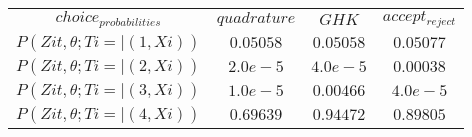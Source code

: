 \begin{tabular}{cccc}
$choice_{probabilities}$ & $quadrature$ & $GHK$ & $accept_{reject}$\\
$P\left( Zit, \theta; Ti = |\left( 1, Xi \right) \right)$ & $0.05058$ & $0.05058$ & $0.05077$\\
$P\left( Zit, \theta; Ti = |\left( 2, Xi \right) \right)$ & $2.0e-5$ & $4.0e-5$ & $0.00038$\\
$P\left( Zit, \theta; Ti = |\left( 3, Xi \right) \right)$ & $1.0e-5$ & $0.00466$ & $4.0e-5$\\
$P\left( Zit, \theta; Ti = |\left( 4, Xi \right) \right)$ & $0.69639$ & $0.94472$ & $0.89805$\\
\end{tabular}